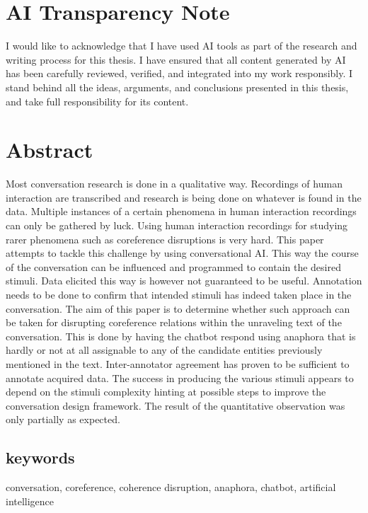 \documentclass[12pt]{report}
\begin{document}
   \section*{AI Transparency Note}
   I would like to acknowledge that I have used AI tools as part of the research and writing process for this thesis.
   I have ensured that all content generated by AI has been carefully reviewed, verified, and integrated into my work responsibly.
   I stand behind all the ideas, arguments, and conclusions presented in this thesis, and take full responsibility for its content.


   \newpage





   \thispagestyle{empty}

   \section*{Abstract}
   Most conversation research is done in a qualitative way.
   Recordings of human interaction are transcribed and research is being done on whatever is found in the data.
   Multiple instances of a certain phenomena in human interaction recordings can only be gathered by luck.
   Using human interaction recordings for
   studying rarer phenomena such as coreference disruptions is very hard.
   This paper attempts to tackle this challenge by using conversational AI.
   This way the course of the conversation can be influenced and
   programmed to contain the desired stimuli.
   Data elicited this way is however not guaranteed to be useful.
   Annotation needs to be done to confirm that intended stimuli has indeed taken place in the conversation.
   The aim of this paper is to determine whether such approach can be taken for disrupting coreference relations
   within the unraveling text of the conversation.
   This is done by having the chatbot respond using anaphora that is hardly or not at all assignable
   to any of the candidate entities previously mentioned in the text.
   Inter-annotator agreement has proven to be sufficient to annotate acquired data.
   The success in producing the various stimuli appears to depend on the stimuli complexity
   hinting at possible steps to improve the conversation design framework.
   The result of the quantitative observation was only partially as expected.

   \subsection*{keywords}
   conversation, coreference, coherence disruption, anaphora, chatbot, artificial intelligence
\end{document}
